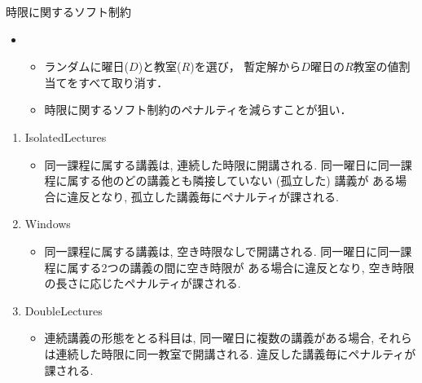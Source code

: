 \documentclass[11pt,dvipdfmx]{beamer}
\begin{document}
\begin{frame}{時限に関するソフト制約}
 \begin{block}{}
 \begin{itemize}
  \item {}
   \begin{itemize}
    \item ランダムに曜日($D$)と教室($R$)を選び，
    暫定解から$D$曜日の$R$教室の値割当てをすべて取り消す．
    \item 時限に関するソフト制約のペナルティを減らすことが狙い．
   \end{itemize}
  \end{itemize}
 \end{block}
 \begin{enumerate}
  \item \alert{IsolatedLectures}
   \begin{itemize}
    \item  同一課程に属する講義は, 連続した時限に開講される. 
    同一曜日に同一課程に属する他のどの講義とも隣接していない (孤立した) 講義が
    ある場合に違反となり, 孤立した講義毎にペナルティが課される.
    \end{itemize}
  \item \alert{Windows}
   \begin{itemize}
    \item 同一課程に属する講義は, 空き時限なしで開講される. 
    同一曜日に同一課程に属する2つの講義の間に空き時限が
    ある場合に違反となり, 空き時限の長さに応じたペナルティが課される.   
    \end{itemize}
  \item DoubleLectures
   \begin{itemize}
    \item 連続講義の形態をとる科目は, 同一曜日に複数の講義がある場合, 
    それらは連続した時限に同一教室で開講される. 
    違反した講義毎にペナルティが課される.   
    \end{itemize}
 \end{enumerate}
\end{frame}
\end{document}
